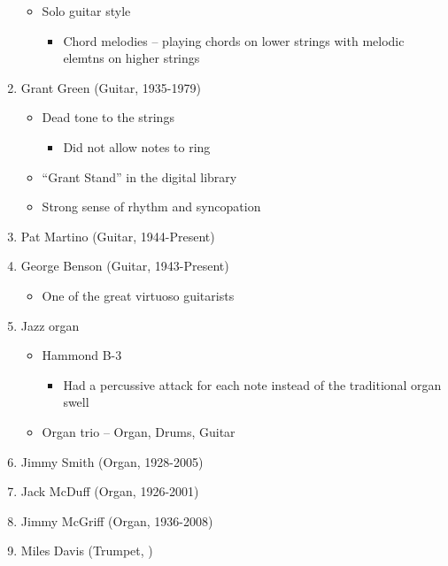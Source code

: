 \documentclass[]{article}
\providecommand{\tightlist}{%
  \setlength{\itemsep}{0pt}\setlength{\parskip}{0pt}}
\begin{document}
\begin{enumerate}
  \begin{itemize}
  \tightlist
  \item
    Solo guitar style

    \begin{itemize}
    \tightlist
    \item
      Chord melodies -- playing chords on lower strings with melodic
      elemtns on higher strings
    \end{itemize}
  \end{itemize}
\item
  Grant Green (Guitar, 1935-1979)

  \begin{itemize}
  \tightlist
  \item
    Dead tone to the strings

    \begin{itemize}
    \tightlist
    \item
      Did not allow notes to ring
    \end{itemize}
  \item
    ``Grant Stand'' in the digital library
  \item
    Strong sense of rhythm and syncopation
  \end{itemize}
\item
  Pat Martino (Guitar, 1944-Present)
\item
  George Benson (Guitar, 1943-Present)

  \begin{itemize}
  \tightlist
  \item
    One of the great virtuoso guitarists
  \end{itemize}
\item
  Jazz organ

  \begin{itemize}
  \tightlist
  \item
    Hammond B-3

    \begin{itemize}
    \tightlist
    \item
      Had a percussive attack for each note instead of the traditional
      organ swell
    \end{itemize}
  \item
    Organ trio -- Organ, Drums, Guitar
  \end{itemize}
\item
  Jimmy Smith (Organ, 1928-2005)
\item
  Jack McDuff (Organ, 1926-2001)
\item
  Jimmy McGriff (Organ, 1936-2008)
\item
  Miles Davis (Trumpet, )
\end{enumerate}
\end{document}
